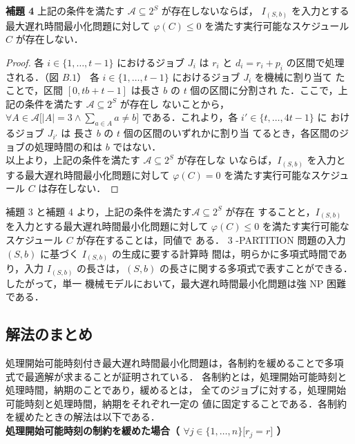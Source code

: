 \documentclass[12pt]{optlab-bachelor}
\begin{document}
  \noindent \textbf{補題 4}
  上記の条件を満たす $\mathcal{A} \subseteq 2^S$ が存在しないならば，
  $I_{(S,b)}$ を入力とする最大遅れ時間最小化問題に対して $\varphi(C) \le
  0$ を満たす実行可能なスケジュール $C$ が存在しない．\\

  \begin{proof}
    各 $i \in \{1,\ldots,t - 1\}$ におけるジョブ $J_i$ は $r_i$ と $d_i =
    r_i + p_i$ の区間で処理される．（図 $B.1$）
    各 $i \in \{1,\ldots,t - 1\}$ におけるジョブ $J_i$ を機械に割り当て
    たことで，区間 $[0,tb + t - 1]$ は長さ $b$ の $t$ 個の区間に分割され
    た．ここで，上記の条件を満たす $\mathcal{A} \subseteq 2^S$ が存在し
    ないことから，$\forall A \in \mathcal{A}\big[|A| = 3 \land \sum_{a \in
    A}a \neq b \big]$ である．これより，各 $i' \in \{t,\ldots,4t - 1\}$ に
    おけるジョブ $J_{i'}$ は 長さ $b$ の $t$ 個の区間のいずれかに割り当
    てるとき，各区間のジョブの処理時間の和は $b$ ではない．\\
    以上より，上記の条件を満たす $\mathcal{A} \subseteq 2^S$ が存在しな
    いならば，$I_{(S,b)}$ を入力とする最大遅れ時間最小化問題に対して
    $\varphi(C) = 0$ を満たす実行可能なスケジュール $C$ は存在しない．
  \end{proof}

  補題 3 と補題 4 より，上記の条件を満たす$\mathcal{A} \subseteq 2^S$ が存在
  することと，$I_{(S,b)}$ を入力とする最大遅れ時間最小化問題に対して
  $\varphi(C) \le  0$
  を満たす実行可能なスケジュール $C$ が存在することは，同値で
  ある．
  3 -PARTITION 問題の入力 $(S,b)$ に基づく $I_{(S,b)}$ の生成に要する計算時
  間は，明らかに多項式時間であり，入力 $I_{(S,b)}$ の長さは，$(S, b)$
  の長さに関する多項式で表すことができる．したがって，単一
  機械モデルにおいて，最大遅れ時間最小化問題は強 NP 困難である．\\

  \subsection{解法のまとめ}
  処理開始可能時刻付き最大遅れ時間最小化問題は，各制約を緩めることで多項
  式で最適解が求まることが証明されている．
  各制約とは，処理開始可能時刻と処理時間，納期のことであり，緩めるとは，
  全てのジョブに対する，処理開始可能時刻と処理時間，納期をそれぞれ一定の
  値に固定することである．各制約を緩めたときの解法は以下である．\\

  \noindent\textbf{処理開始可能時刻の制約を緩めた場合（ $\forall j \in \{1,\ldots,n\}\big[ r_j = r \big]$ ）}
\end{document}
